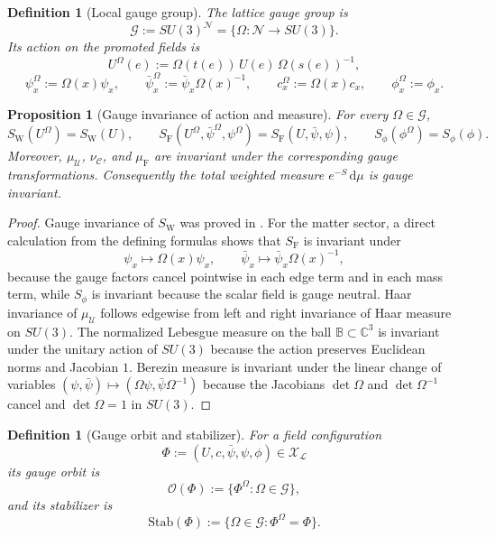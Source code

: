 \documentclass[11pt]{article}
\newtheorem{definition}[theorem]{Definition}
\newtheorem{proposition}[theorem]{Proposition}
\theoremstyle{remark}
\newcommand{\C}{\mathbb C}
\newcommand{\mcN}{\mathcal N}
\newcommand{\mcG}{\mathcal G}
\newcommand{\mcU}{\mathscr U}
\newcommand{\mcCaux}{\mathscr C}
\newcommand{\mcX}{\mathscr X}
\newcommand{\mcO}{\mathcal O}
\newcommand{\bbB}{\mathbb B}
\newcommand{\dd}{\,\mathrm d}
\begin{document}
\begin{definition}[Local gauge group]
\label{def:gauge-group}
The lattice gauge group is
\[
\mcG:=SU(3)^{\mcN}
=\{\Omega:\mcN\to SU(3)\}.
\]
Its action on the promoted fields is
\[
U^\Omega(e):=\Omega(t(e))\,U(e)\,\Omega(s(e))^{-1},
\]
\[
\psi_x^\Omega:=\Omega(x)\psi_x,\qquad
\bar\psi_x^\Omega:=\bar\psi_x\Omega(x)^{-1},\qquad
c_x^\Omega:=\Omega(x)c_x,\qquad
\phi_x^\Omega:=\phi_x.
\]
\end{definition}

\begin{proposition}[Gauge invariance of action and measure]
\label{prop:gauge-measure}
For every $\Omega\in\mcG$,
\[
S_{\mathrm W}(U^\Omega)=S_{\mathrm W}(U),\qquad
S_{\mathrm F}(U^\Omega,\bar\psi^\Omega,\psi^\Omega)=S_{\mathrm F}(U,\bar\psi,\psi),
\qquad
S_\phi(\phi^\Omega)=S_\phi(\phi).
\]
Moreover, $\mu_{\mcU}$, $\nu_{\mcCaux}$, and $\mu_{\mathrm F}$ are invariant
under the corresponding gauge transformations.  Consequently the total weighted
measure $e^{-S}\dd\mu$ is gauge invariant.
\end{proposition}
\begin{proof}
Gauge invariance of $S_{\mathrm W}$ was proved in \cite{continuumqft}.  For the
matter sector, a direct calculation from the defining formulas shows that
$S_{\mathrm F}$ is invariant under
\[
\psi_x\mapsto\Omega(x)\psi_x,\qquad
\bar\psi_x\mapsto\bar\psi_x\Omega(x)^{-1},
\]
because the gauge factors cancel pointwise in each edge term and in each mass
term, while $S_\phi$ is invariant because the scalar field is gauge neutral.
Haar invariance of $\mu_{\mcU}$
follows edgewise from left and right invariance of Haar measure on $SU(3)$.
The normalized Lebesgue measure on the ball $\bbB\subset\C^3$ is invariant
under the unitary action of $SU(3)$ because the action preserves Euclidean
norms and Jacobian $1$.  Berezin measure is invariant under the linear change of
variables $(\psi,\bar\psi)\mapsto(\Omega\psi,\bar\psi\Omega^{-1})$ because the
Jacobians $\det\Omega$ and $\det\Omega^{-1}$ cancel and $\det\Omega=1$ in
$SU(3)$.
\end{proof}

\begin{definition}[Gauge orbit and stabilizer]
\label{def:orbit}
For a field configuration
\[
\Phi:=(U,c,\bar\psi,\psi,\phi)\in\mcX_\mathcal L
\]
its gauge orbit is
\[
\mcO(\Phi):=\{\Phi^\Omega:\Omega\in\mcG\},
\]
and its stabilizer is
\[
\mathrm{Stab}(\Phi):=\{\Omega\in\mcG:\Phi^\Omega=\Phi\}.
\]
\end{definition}
\end{document}
